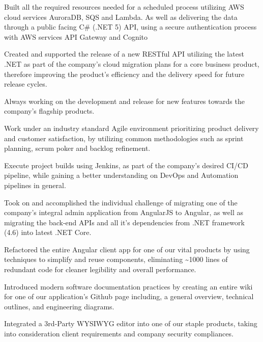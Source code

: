 \documentclass[]{deedy-resume}
\begin{document}
\vspace{\topsep} %
\begin{tightemize}
\item Built all the required resources needed for a scheduled process utilizing AWS cloud services AuroraDB, SQS and Lambda. As well as delivering the data through a public facing C\# (.NET 5) API,  using a secure authentication process with AWS services API Gateway and Cognito
\item Created and supported the release of a new RESTful API utilizing the latest .NET as part of the company's cloud migration plans for a core business product, therefore improving the product's efficiency and the delivery speed for future release cycles.
\item Always working on the development and release for new features towards the company's flagship products.
\item Work under an industry standard Agile environment prioritizing product delivery and customer satisfaction, by utilizing common methodologies such as sprint planning, scrum poker and backlog refinement.
\item Execute project builds using Jenkins, as part of the company's desired CI/CD pipeline, while gaining a better understanding on DevOps and Automation pipelines in general. 
\end{tightemize}
\sectionsep

\begin{tightemize}
\item Took on and accomplished the individual challenge of migrating one of the company's integral admin application from AngularJS to Angular, as well as migrating the back-end APIs and all it's dependencies from .NET framework (4.6) into latest .NET Core.
\item Refactored the entire Angular client app for one of our vital products by using techniques to simplify and reuse components, eliminating \textasciitilde1000 lines of redundant code for cleaner legibility and overall performance.
\item Introduced modern software documentation practices by creating an entire wiki for one of our application's Github page including, a general overview, technical outlines, and engineering diagrams.
\item Integrated a 3rd-Party WYSIWYG editor into one of our staple products, taking into consideration client requirements and company security compliances.
\end{tightemize}
\sectionsep
\end{document}
